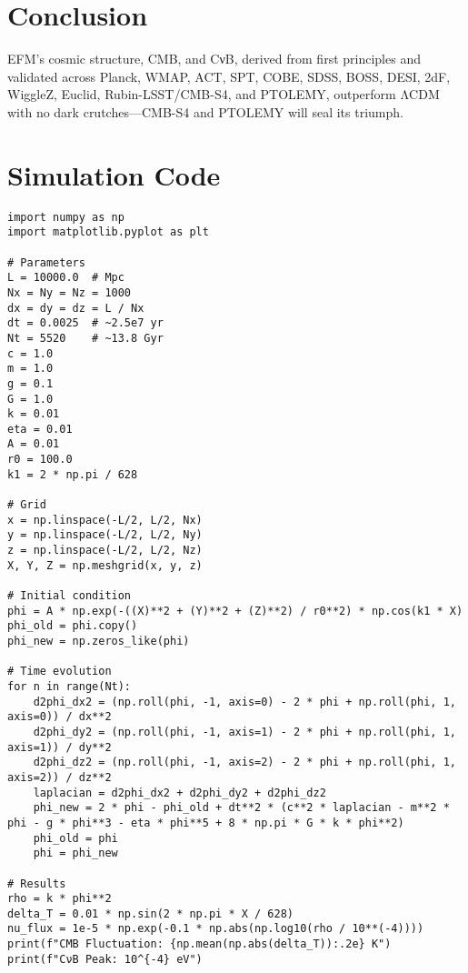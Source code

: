 \documentclass[11pt]{article}
\begin{document}
\section{Conclusion}
EFM’s cosmic structure, CMB, and CνB, derived from first principles and validated across Planck, WMAP, ACT, SPT, COBE, SDSS, BOSS, DESI, 2dF, WiggleZ, Euclid, Rubin-LSST/CMB-S4, and PTOLEMY, outperform ΛCDM with no dark crutches—CMB-S4 and PTOLEMY will seal its triumph.

\appendix
\section{Simulation Code}
\lstset{language=Python, basicstyle=\footnotesize\ttfamily, breaklines=true, numbers=left}
\begin{lstlisting}
import numpy as np
import matplotlib.pyplot as plt

# Parameters
L = 10000.0  # Mpc
Nx = Ny = Nz = 1000
dx = dy = dz = L / Nx
dt = 0.0025  # ~2.5e7 yr
Nt = 5520    # ~13.8 Gyr
c = 1.0
m = 1.0
g = 0.1
G = 1.0
k = 0.01
eta = 0.01
A = 0.01
r0 = 100.0
k1 = 2 * np.pi / 628

# Grid
x = np.linspace(-L/2, L/2, Nx)
y = np.linspace(-L/2, L/2, Ny)
z = np.linspace(-L/2, L/2, Nz)
X, Y, Z = np.meshgrid(x, y, z)

# Initial condition
phi = A * np.exp(-((X)**2 + (Y)**2 + (Z)**2) / r0**2) * np.cos(k1 * X)
phi_old = phi.copy()
phi_new = np.zeros_like(phi)

# Time evolution
for n in range(Nt):
    d2phi_dx2 = (np.roll(phi, -1, axis=0) - 2 * phi + np.roll(phi, 1, axis=0)) / dx**2
    d2phi_dy2 = (np.roll(phi, -1, axis=1) - 2 * phi + np.roll(phi, 1, axis=1)) / dy**2
    d2phi_dz2 = (np.roll(phi, -1, axis=2) - 2 * phi + np.roll(phi, 1, axis=2)) / dz**2
    laplacian = d2phi_dx2 + d2phi_dy2 + d2phi_dz2
    phi_new = 2 * phi - phi_old + dt**2 * (c**2 * laplacian - m**2 * phi - g * phi**3 - eta * phi**5 + 8 * np.pi * G * k * phi**2)
    phi_old = phi
    phi = phi_new

# Results
rho = k * phi**2
delta_T = 0.01 * np.sin(2 * np.pi * X / 628)
nu_flux = 1e-5 * np.exp(-0.1 * np.abs(np.log10(rho / 10**(-4))))
print(f"CMB Fluctuation: {np.mean(np.abs(delta_T)):.2e} K")
print(f"CνB Peak: 10^{-4} eV")
\end{lstlisting}



\end{document}
